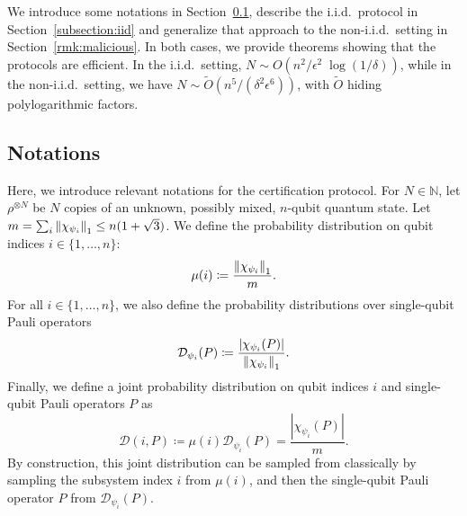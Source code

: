 \documentclass[a4paper,twocolumn,11pt,unpublished]{quantumarticle}
\newcommand{\np}{m}
\newcommand{\pdist}{\mathcal D} %
\newcommand{\qubit}{i}
\begin{document}
We introduce some notations in Section\ \ref{subsection:notations}, describe the i.i.d.\ protocol in Section\ \ref{subsection:iid} and generalize that approach to the non-i.i.d.\ setting in Section\ \ref{rmk:malicious}. In both cases, we provide theorems showing that the protocols are efficient. In the i.i.d.\ setting, $N \sim O(n^2/\epsilon^2 \; \log(1/\delta))$, while in the non-i.i.d.\ setting, we have $N\sim \tilde O(n^5/(\delta^2\epsilon^6))$, with $\tilde O$ hiding polylogarithmic factors.


\subsection{Notations}
\label{subsection:notations}
Here, we introduce relevant notations for the certification protocol.
            For
            $N\in\mathbb
            N$, let $\rho^{\otimes N}$ be $N$ copies of an unknown, possibly mixed, $n$-qubit quantum state.
            Let $\np=\sum_\qubit \norm{\chi_{\psi_\qubit}}_1\le n(1+\sqrt3)$. We define the probability distribution on qubit indices $i\in\{1,\dots,n\}$:
            \begin{equation}
            \label{mu_i}
                \mu(\qubit) \coloneqq \frac{\norm{\chi_{\psi_\qubit}}_1}\np.
            \end{equation}
            For all $i\in\{1,\dots,n\}$, we also define the probability distributions over single-qubit Pauli operators
            \begin{equation}
            \label{Dpsi_iP}
                \mathcal{D}_{\psi_i}(P) \coloneqq \frac{|\chi_{\psi_i}(P)|}{\left\lVert\chi_{\psi_i}\right\rVert_1}.
            \end{equation}
             Finally, we define a joint probability distribution on qubit indices $i$ and single-qubit Pauli operators $P$ as
             \begin{equation}
            \label{DpsiPi}
                \pdist(\qubit, P) \coloneqq \mu(\qubit)\pdist_{\psi_\qubit}(P)=\frac{|\chi_{\psi_i}(P)|}\np.
            \end{equation}
            By construction, this joint distribution can be sampled from classically by sampling the subsystem index $i$ from $\mu(i)$, and then the single-qubit Pauli operator $P$ from $\mathcal{D}_{\psi_i}(P)$.


\end{document}
